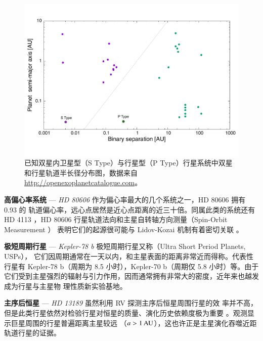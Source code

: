 \begin{figure}[h]
\centering
\includegraphics[width=1.0\textwidth]{figures/chapter1/fig13_binaryplanet.pdf}
\caption{已知双星内卫星型（S Type）与行星型（P Type）行星系统中双星和行星轨道半长径分布图，数据来自 \url{http://openexoplanetcatalogue.com}。}
\label{fig:pibinary}
\end{figure}

\textbf{高偏心率系统} --- \textit{HD 80606}  {}  作为偏心率最大的几个系统之一，HD 80606 拥有 0.93 的
轨道偏心率\cite{Naef2001}，远心点居然是近心点距离的近三十倍。同属此类的系统还有 HD 4113
\cite{Tamuz2008}，HD 80606 行星轨道法向和主星自转轴方向测量（Spin-Orbit Measurement ）
\cite{Pont2009}表明它们的起源很可能与 Lidov-Kozai 机制\cite{Lidov1962,Kozai1962}有着密切关联
\cite{Wu2003}。

\textbf{极短周期行星} --- \textit{Kepler-78 b}  {}  极短周期行星又称（Ultra Short Period Planets, USPs），
它们因周期通常在一天以内，和主星表面的距离非常近而得称。代表性行星有 Kepler-78 b（周期为 
8.5 小时\cite{SanchisOjeda2013}），Kepler-70 b（周期仅 5.8 小时\cite{Charpinet2011}）等。由于
它们受到主星强烈的辐射与引力作用，因而通常拥有非常大的密度，近年来也越发成为行星与主星物
理性质新实验基地\cite{Lopez2016,Moutou2016}。

\textbf{主序后恒星} --- \textit{HD 13189}\cite{Hatzes2005}  {}  虽然利用 RV 探测主序后恒星周围行星的效
率并不高\cite{Sato2005}，但是此类行星依然对检验行星对恒星的质量、演化历史依赖度极为重要
\cite{Kennedy2008,Johnson2007b,Jones2014}。观测显示巨星周围的行星普遍距离主星较远
（$a > 1\,\mathrm{AU}$），这也许正是主星演化吞噬近距轨道行星的证据\cite{Johnson2007a,Bowler2010}。

